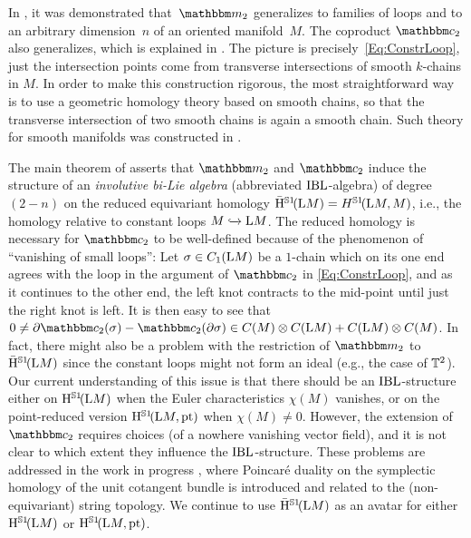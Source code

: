 \documentclass[\MainFolder/Text.tex]{subfiles}
\begin{document}
In \cite{Sullivan1999}, it was demonstrated that~$\StringOp_2$ generalizes to families of loops and to an arbitrary dimension~$n$ of an oriented manifold~$M$. The coproduct $\StringCoOp_2$ also generalizes, which is explained in \cite{Basu2011}. The picture is precisely~\eqref{Eq:ConstrLoop}, just the intersection points come from transverse intersections of smooth $k$-chains in $M$. In order to make this construction rigorous, the most straightforward way is to use a geometric homology theory based on smooth chains, so that the transverse intersection of two smooth chains is again a smooth chain. Such theory for smooth manifolds was constructed in \cite{Lipyanskiy2014}.

The main theorem of \cite{Chas2004} asserts that $\StringOp_2$ and $\StringCoOp_2$ induce the structure of an \emph{involutive bi-Lie algebra} (abbreviated $\mathrm{IBL}$-algebra) of degree $(2-n)$ on the reduced equivariant homology $\bar{\mathrm{H}}^{\mathbb{S}{1}}\!(\mathrm{L} M) = H^{\mathbb{S}{1}}\!(\mathrm{L} M,M)$, i.e., the homology relative to constant loops $M\xhookrightarrow{}\mathrm{L} M$. The reduced homology is necessary for $\StringCoOp_2$ to be well-defined because of the phenomenon of ``vanishing of small loops'':  Let $\sigma\in C_1(\mathrm{L} M)$ be a $1$-chain which on its one end agrees with the loop in the argument of $\StringCoOp_2$ in \eqref{Eq:ConstrLoop}, and as it continues to the other end, the left knot contracts to the mid-point until just the right knot is left. It is then easy to see that $ 0 \neq \Bdd \StringCoOp_2(\sigma) - \StringCoOp_2(\Bdd \sigma) \in C(M)\otimes C(\Loop M) + C(\Loop M)\otimes C(M)$. In fact, there might also be a problem with the restriction of $\StringOp_2$ to $\bar{\mathrm{H}}^{\mathbb{S}{1}}\!(\mathrm{L} M)$ since the constant loops might not form an ideal (e.g., the case of $\mathbb{T}^2$). Our current understanding of this issue is that there should be an $\mathrm{IBL}$-structure either on $\mathrm{H}^{\mathbb{S}{1}}\!(\mathrm{L} M)$ when the Euler characteristics $\chi(M)$ vanishes, or on the point-reduced version $\mathrm{H}^{\mathbb{S}{1}}\!(\mathrm{L} M,\mathrm{pt})$ when $\chi(M) \neq 0$. However, the extension of $\StringCoOp_2$ requires choices (of a nowhere vanishing vector field), and it is not clear to which extent they influence the $\mathrm{IBL}$-structure. These problems are addressed in the work in progress \cite{Cieliebak2018}, where Poincar\'e duality on the symplectic homology of the unit cotangent bundle is introduced and related to the (non-equivariant) string topology. We continue to use $\bar{\mathrm{H}}^{\mathbb{S}{1}}\!(\mathrm{L} M)$ as an avatar for either $\mathrm{H}^{\mathbb{S}{1}}\!(\mathrm{L} M)$ or $\mathrm{H}^{\mathbb{S}{1}}\!(\mathrm{L} M,\mathrm{pt})$.
\end{document}
